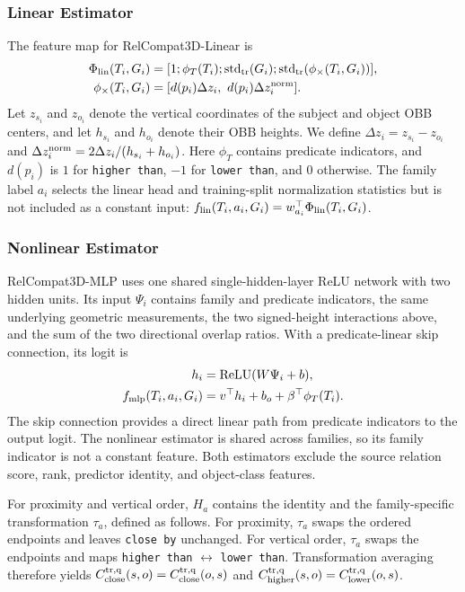 \subsubsection{Linear Estimator}
The feature map for RelCompat3D-Linear is 
\begin{equation}
\begin{aligned}
\Phi_{\rm lin}(T_i,G_i)&=[1;\phi_T(T_i);\operatorname{std}_{\rm tr}(G_i);
\operatorname{std}_{\rm tr}(\phi_{\times}(T_i,G_i))],\\
\phi_{\times}(T_i,G_i)&=
[d(p_i)\Delta z_i,\ d(p_i)\Delta z_i^{\rm norm}].
\end{aligned}
\end{equation}
Let $z_{s_i}$ and $z_{o_i}$ denote the vertical coordinates of the subject and object OBB centers, and let $h_{s_i}$ and $h_{o_i}$ denote their OBB heights. We define $\Delta z_i=z_{s_i}-z_{o_i}$ and $\Delta z_i^{\rm norm}=2\Delta z_i / (h_{s_i}+h_{o_i})$.
Here $\phi_T$ contains predicate indicators, and $d(p_i)$ is $1$ for \texttt{higher than}, $-1$ for \texttt{lower than}, and $0$ otherwise. The family label $a_i$ selects the linear head and training-split normalization statistics but is not included as a constant input: $f_{\rm lin}(T_i,a_i,G_i)=w_{a_i}^\top\Phi_{\rm lin}(T_i,G_i)$.

\subsubsection{Nonlinear Estimator}
RelCompat3D-MLP uses one shared single-hidden-layer ReLU network with two hidden units. Its input $\Psi_i$ contains family and predicate indicators, the same underlying geometric measurements, the two signed-height interactions above, and the sum of the two directional overlap ratios. With a predicate-linear skip connection, its logit is
\begin{equation}
\begin{aligned}
h_i&=\operatorname{ReLU}(W\Psi_i+b),\\
f_{\rm mlp}(T_i,a_i,G_i)&=v^\top h_i+b_o+
\beta^\top\phi_T(T_i).
\end{aligned}
\end{equation}
The skip connection provides a direct linear path from predicate indicators to the output logit. The nonlinear estimator is shared across families, so its family indicator is not a constant feature. Both estimators exclude the source relation score, rank, predictor identity, and object-class features.

For proximity and vertical order, $H_a$ contains the identity and the family-specific transformation $\tau_a$, defined as follows. For proximity, $\tau_a$ swaps the ordered endpoints and leaves \texttt{close by} unchanged. For vertical order, $\tau_a$ swaps the endpoints and maps \texttt{higher than} $\leftrightarrow$ \texttt{lower than}. Transformation averaging therefore yields 
$C^{\rm tr,q}_{\rm close}(s,o)=C^{\rm tr,q}_{\rm close}(o,s)$ and
$C^{\rm tr,q}_{\rm higher}(s,o)=C^{\rm tr,q}_{\rm lower}(o,s)$.

